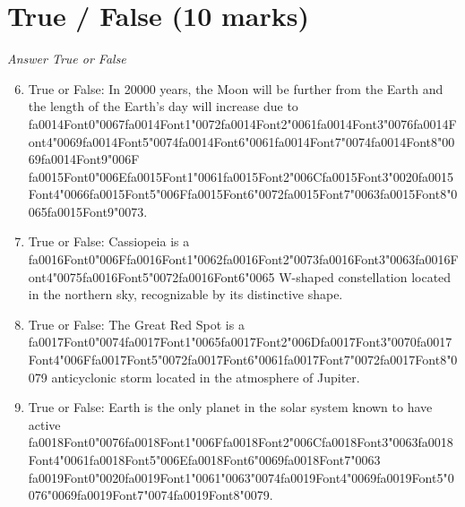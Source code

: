 \documentclass[12pt]{article}
\begin{document}
\section*{True / False (10 marks)}
\textit{Answer True or False}
\begin{enumerate}[label=\arabic*.]
\setcounter{enumi}{5}
\item True or False: In 20000 years, the Moon will be further from the Earth and the length of the Earth's day will increase due to {\csname fa0014Font0\endcsname\char"0067}{\csname fa0014Font1\endcsname\char"0072}{\csname fa0014Font2\endcsname\char"0061}{\csname fa0014Font3\endcsname\char"0076}{\csname fa0014Font4\endcsname\char"0069}{\csname fa0014Font5\endcsname\char"0074}{\csname fa0014Font6\endcsname\char"0061}{\csname fa0014Font7\endcsname\char"0074}{\csname fa0014Font8\endcsname\char"0069}{\csname fa0014Font9\endcsname\char"006F} {\csname fa0015Font0\endcsname\char"006E}{\csname fa0015Font1\endcsname\char"0061}{\csname fa0015Font2\endcsname\char"006C}{\csname fa0015Font3\endcsname\char"0020}{\csname fa0015Font4\endcsname\char"0066}{\csname fa0015Font5\endcsname\char"006F}{\csname fa0015Font6\endcsname\char"0072}{\csname fa0015Font7\endcsname\char"0063}{\csname fa0015Font8\endcsname\char"0065}{\csname fa0015Font9\endcsname\char"0073}.
\item True or False: Cassiopeia is a {\csname fa0016Font0\endcsname\char"006F}{\csname fa0016Font1\endcsname\char"0062}{\csname fa0016Font2\endcsname\char"0073}{\csname fa0016Font3\endcsname\char"0063}{\csname fa0016Font4\endcsname\char"0075}{\csname fa0016Font5\endcsname\char"0072}{\csname fa0016Font6\endcsname\char"0065} W-shaped constellation located in the northern sky, recognizable by its distinctive shape.
\item True or False: The Great Red Spot is a {\csname fa0017Font0\endcsname\char"0074}{\csname fa0017Font1\endcsname\char"0065}{\csname fa0017Font2\endcsname\char"006D}{\csname fa0017Font3\endcsname\char"0070}{\csname fa0017Font4\endcsname\char"006F}{\csname fa0017Font5\endcsname\char"0072}{\csname fa0017Font6\endcsname\char"0061}{\csname fa0017Font7\endcsname\char"0072}{\csname fa0017Font8\endcsname\char"0079} anticyclonic storm located in the atmosphere of Jupiter.
\item True or False: Earth is the only planet in the solar system known to have active {\csname fa0018Font0\endcsname\char"0076}{\csname fa0018Font1\endcsname\char"006F}{\csname fa0018Font2\endcsname\char"006C}{\csname fa0018Font3\endcsname\char"0063}{\csname fa0018Font4\endcsname\char"0061}{\csname fa0018Font5\endcsname\char"006E}{\csname fa0018Font6\endcsname\char"0069}{\csname fa0018Font7\endcsname\char"0063} {\csname fa0019Font0\endcsname\char"0020}{\csname fa0019Font1\endcsname\char"0061}{\char"0063}{\char"0074}{\csname fa0019Font4\endcsname\char"0069}{\csname fa0019Font5\endcsname\char"0076}{\char"0069}{\csname fa0019Font7\endcsname\char"0074}{\csname fa0019Font8\endcsname\char"0079}.

\end{enumerate}
\end{document}
